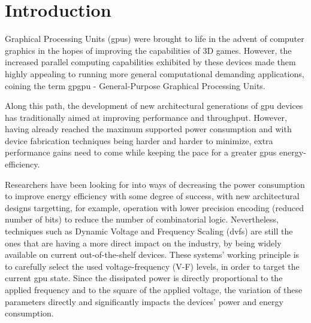 
\chapter{Introduction}
\label{chapter:introduction}

Graphical Processing Units (\acrshort{gpu}s) were brought to life in the advent of computer graphics in the hopes of improving the capabilities of 3D games. However, the increased parallel computing capabilities exhibited by these devices made them highly appealing to running more general computational demanding applications, coining the term \acrshort{gpgpu} - General-Purpose Graphical Processing Units.

Along this path, the development of new architectural generations of \acrshort{gpu} devices has traditionally aimed at improving performance and throughput. However, having already reached the maximum supported power consumption and with device fabrication techniques being harder and harder to minimize, extra performance gains need to come while keeping the pace for a greater \acrshort{gpu}s energy-efficiency.

Researchers have been looking for into ways of decreasing the power consumption to improve energy efficiency with some degree of success, with new architectural designs targetting, for example, operation with lower precision encoding (reduced number of bits) to reduce the number of combinatorial logic. Nevertheless, techniques such as Dynamic Voltage and Frequency Scaling (\acrshort{dvfs}) are still the ones that are having a more direct impact on the industry, by being widely available on current out-of-the-shelf devices. These systems' working principle is to carefully select the used voltage-frequency (V-F) levels, in order to target the current \acrshort{gpu} state. Since the dissipated power is directly proportional to the applied frequency and to the square of the applied voltage, the variation of these parameters directly and significantly impacts the devices' power and energy consumption.

